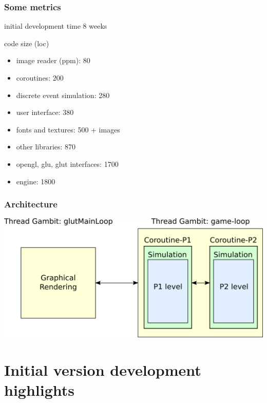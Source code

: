 \documentclass{beamer}
\newcommand{\<}[1]{\`#1}
\begin{document}
\begin{frame}
  \frametitle{Some metrics}

  \begin{block}{initial development time}
    8 weeks
  \end{block}

  \begin{block}{code size (loc)}
    \begin{itemize}
    \item image reader (ppm): 80
    \item coroutines: 200
    \item discrete event simulation: 280
    \item user interface: 380
    \item fonts and textures: 500 + images
    \item other libraries: 870
    \item opengl, glu, glut interfaces: 1700
    \item \alert{engine: 1800}
    \end{itemize}
  \end{block}
\end{frame}

\begin{frame}
  \frametitle{Architecture}
  \includegraphics[scale=0.7]{arch-en}
\end{frame}



\section{Initial version development highlights}
\end{document}
